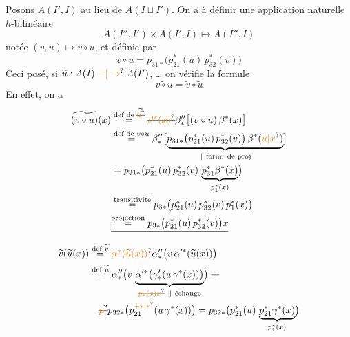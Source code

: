 Posons $A(I',I)$ au lieu de $A(I\sqcup I')$. 
On a à définir une application naturelle $h$-bilinéaire
\[
 A(I'',I')\times A(I',I)\longmapsto A(I'',I)
\]
notée \qquad $(v,u)\longmapsto v\circ u$, \qquad et définie par
\[
 v\circ u=p_{31*}\bigl(p_{21}^*(u)\,p_{32}^*(v)\bigr)
\]
Ceci posé, si $\widetilde u:A(I)\mathrel{\unsure{-|\to}} A(I')$,  \ldots{} on
vérifie la formule
\[
 \widetilde{v\circ u}=\widetilde v\circ\widetilde u
\]
En effet, on a
\[
\begin{aligned}
\widetilde{(v\circ u)}(x)&\overset{\text{def de }\widetilde{\deleted{\unsure{u}}}}{=}
 \deleted{\unsure{\beta^*(x)}}\beta''_*\bigl[(v\circ u)\,\beta^*(x)\bigr]\\
&\overset{\text{def de }v\circ u}{=}\beta''_*\bigl[
 \underbrace{p_{31*}\bigl(p_{21}^*(u)\,p_{32}^*(v)\bigr)\,\beta^*(\unsure{u|x})}_{\parallel\ \text{form. de proj}}\bigr]\\
&=p_{31*}\bigl(p_{21}^*(u)\,p_{32}^*(v)\,
 \underbrace{p_{31}^*\beta^*(x)}_{p_1^*(x)}\bigr)\\
&\overset{\text{transitivité}}{=}p_{3*}\bigl(p_{21}^*(u)\,p_{32}^*(v)\,p_1^*(x)\bigr)\\
&\deleted{\overset{\text{projection}}{=}p_{3*}\bigl(p_{21}^*(u)\,p_{32}^*(v)\bigr)x}
\end{aligned}
\]
\[
\begin{aligned}
\widetilde v(\widetilde u(x))&\overset{\text{def }\widetilde v}{=}
\deleted{\unsure{\alpha^*(\widetilde u(x))}}\alpha''_*\bigl(v\,\alpha'^*(\widetilde u(x))\bigr)\\
&\overset{\text{def }\widetilde u}{=}\alpha''_*\bigl(v\,
 \underbrace{\alpha'^*\bigl(\gamma'_*(u\,\gamma^*(x))\bigr)}_{\deleted{\unsure{p_*(x)x}}\ \parallel\ \text{échange}}\bigr)\ \deleted{=}\\
&\hspace{1em}\deleted{\unsure{p}}p_{32*}\bigl(p_{21}^{\unsure{+*|*}}(u\,\gamma^*(x))\bigr)
=p_{32*}\bigl(p_{21}^*(u)\,\underbrace{p_{21}^*\gamma^*(x)}_{p_1^*(x)}\bigr)
\end{aligned}
\]
